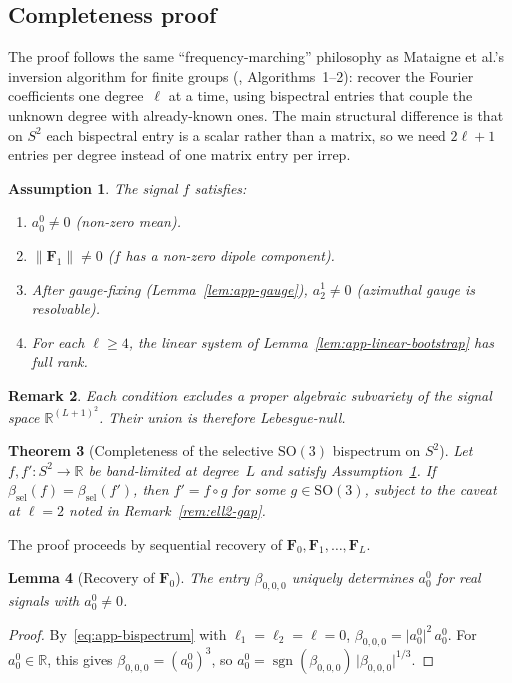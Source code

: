 \documentclass{article}
\newtheorem{theorem}{Theorem}
\newtheorem{lemma}[theorem]{Lemma}
\newtheorem{remark}[theorem]{Remark}
\DeclareMathOperator{\sgn}{sgn}
\newcommand{\R}{\mathbb{R}}
\newcommand{\SO}{\mathrm{SO}}
\newcommand{\abs}[1]{\lvert #1 \rvert}
\newcommand{\norm}[1]{\lVert #1 \rVert}
\newtheorem{assumption}[theorem]{Assumption}
\begin{document}
\subsection{Completeness proof}

The proof follows the same ``frequency-marching'' philosophy as
Mataigne et al.'s inversion algorithm for finite groups
(\citep{mataigne2024selective}, Algorithms~1--2): recover the Fourier
coefficients one degree~$\ell$ at a time, using
bispectral entries that couple the unknown degree with already-known
ones. The main structural difference is that on $S^2$ each bispectral
entry is a scalar rather than a matrix, so we need $2\ell+1$ entries
per degree instead of one matrix entry per irrep.

\begin{assumption}\label{ass:app-generic}
The signal $f$ satisfies:
\begin{enumerate}[label=(G\arabic*),nosep]
  \item $a_0^0 \ne 0$ (non-zero mean).
  \item $\norm{\mathbf{F}_1} \ne 0$ ($f$ has a non-zero dipole component).
  \item After gauge-fixing (Lemma~\ref{lem:app-gauge}), $a_2^1 \ne 0$
    (azimuthal gauge is resolvable).
  \item For each $\ell \ge 4$, the linear system of
    Lemma~\ref{lem:app-linear-bootstrap} has full rank.
\end{enumerate}
\end{assumption}

\begin{remark}
Each condition excludes a proper algebraic subvariety of the signal
space $\R^{(L+1)^2}$. Their union is therefore Lebesgue-null.
\end{remark}

\begin{theorem}[Completeness of the selective $\SO(3)$ bispectrum on $S^2$]
\label{thm:app-main}
Let $f, f' : S^2 \to \R$ be band-limited at degree~$L$ and satisfy
Assumption~\ref{ass:app-generic}. If
$\beta_{\mathrm{sel}}(f) = \beta_{\mathrm{sel}}(f')$,
then $f' = f \circ g$ for some $g \in \SO(3)$, subject to the caveat
at $\ell = 2$ noted in Remark~\ref{rem:ell2-gap}.
\end{theorem}

The proof proceeds by sequential recovery of
$\mathbf{F}_0, \mathbf{F}_1, \dotsc, \mathbf{F}_L$.

\begin{lemma}[Recovery of $\mathbf{F}_0$]\label{lem:app-F0}
The entry $\beta_{0,0,0}$ uniquely determines $a_0^0$ for real signals
with $a_0^0 \ne 0$.
\end{lemma}
\begin{proof}
By~\eqref{eq:app-bispectrum} with $\ell_1 = \ell_2 = \ell = 0$,
$\beta_{0,0,0} = \abs{a_0^0}^2 \, a_0^0$.
For $a_0^0 \in \R$, this gives $\beta_{0,0,0} = (a_0^0)^3$, so
$a_0^0 = \sgn(\beta_{0,0,0})\,\abs{\beta_{0,0,0}}^{1/3}$.
\end{proof}
\end{document}
